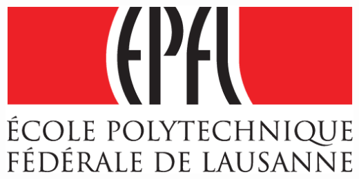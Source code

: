 \begin{titlepage}

\includegraphics[width=0.5\linewidth]{Logo}\\[1cm] %
 

\vfill %

\end{titlepage}
